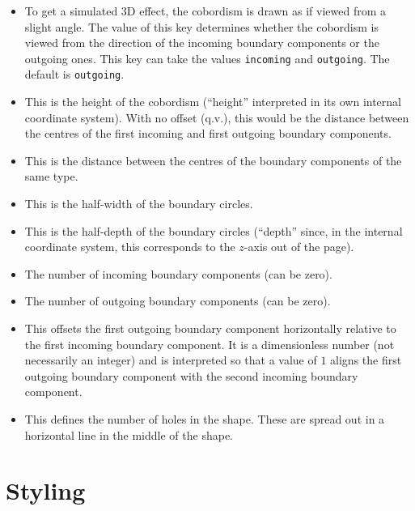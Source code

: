 \documentclass{ltxdoc}
\begin{document}
\begin{itemize}
\item {} To get a simulated 3D effect, the cobordism is drawn as if viewed from a slight angle.
The value of this key determines whether the cobordism is viewed from the direction of the incoming boundary components or the outgoing ones.
This key can take the values \Verb+incoming+ and \Verb+outgoing+.
The default is \Verb+outgoing+.
\item {} This is the height of the cobordism (``height'' interpreted in its own internal coordinate system).
With no offset (q.v.), this would be the distance between the centres of the first incoming and first outgoing boundary components.

\item {} This is the distance between the centres of the boundary components of the same type.

\item {} This is the half-width of the boundary circles.

\item {} This is the half-depth of the boundary circles (``depth'' since, in the internal coordinate system, this corresponds to the \(z\)-axis out of the page).

\item {} The number of incoming boundary components (can be zero).

\item {} The number of outgoing boundary components (can be zero).

\item {} This offsets the first outgoing boundary component horizontally relative to the first incoming boundary component.
It is a dimensionless number (not necessarily an integer) and is interpreted so that a value of \(1\) aligns the first outgoing boundary component with the second incoming boundary component.

\item {} This defines the number of holes in the shape.
These are spread out in a horizontal line in the middle of the shape.
\end{itemize}

\section{Styling}
\end{document}
